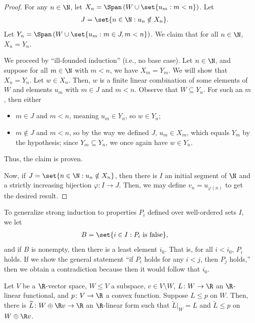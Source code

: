 \documentclass[10pt]{mypackage}
\begin{document}
\begin{proof}
  For any $n\in \N$, let $X_n = \Span\left( W\cup \set{u_m : m  < n} \right)$. Let
  \begin{align*}
    J &= \set{n\in \N : u_n\notin X_n}.
  \end{align*}
  Let $Y_n = \Span\left( W\cup \set{u_m : m\in J,m < n} \right)$. We claim that for all $n\in \N$, $X_n = Y_n$.

  We proceed by ``ill-founded induction'' (i.e., no base case). Let $n\in \N$, and suppose for all $m\in \N$ with $m < n$, we have $X_m = Y_m$. We will show that $X_n = Y_n$. Let $w\in X_n$. Then, $w$ is a finite linear combination of some elements of $W$ and elements $u_m$ with $m\in J$ and $m < n$. Observe that $W\subseteq Y_n$. For such an $m$, then either
  \begin{itemize}
    \item $m\in J$ and $m < n$, meaning $u_m\in Y_n$, so $w\in Y_n$;
    \item $m\notin J$ and $m < n$, so by the way we defined $J$, $u_m\in X_{m}$, which equals $Y_m$ by the hypothesis; since $Y_m\subseteq Y_n$, we once again have $w\in Y_n$.
  \end{itemize}
  Thus, the claim is proven.

  Now, if $J = \set{n\in \N : u_n\notin X_n}$, then there is $I$ an initial segment of $\N$ and a strictly increasing bijection $\varphi\colon I\to J$. Then, we may define $v_n = u_{\varphi(n)}$ to get the desired result.
\end{proof}
\begin{remark}
  To generalize strong induction to properties $P_i$ defined over well-ordered sets $I$, we let
  \begin{align*}
    B &= \set{i\in I : P_i\text{ is false}},
  \end{align*}
  and if $B$ is nonempty, then there is a least element $i_0$. That is, for all $i < i_0$, $P_i$ holds. If we show the general statement ``if $P_i$ holds for any $i < j$, then $P_j$ holds,'' then we obtain a contradiction because then it would follow that $i_0$.
\end{remark}
\begin{proposition}
  Let $V$ be a $\R$-vector space, $W\leq V$ a subspace, $v\in V\setminus W$, $L\colon W\to\R$ an $\R$-linear functional, and $p\colon V\to \R$ a convex function. Suppose $L\leq p$ on $W$. Then, there is $ \widetilde{L}\colon W\oplus \R v \to \R $ an $\R$-linear form such that $ \widetilde{L}|_{W} = L $ and $ \widetilde{L}\leq p $ on $W\oplus \R v$.
\end{proposition}
\end{document}
